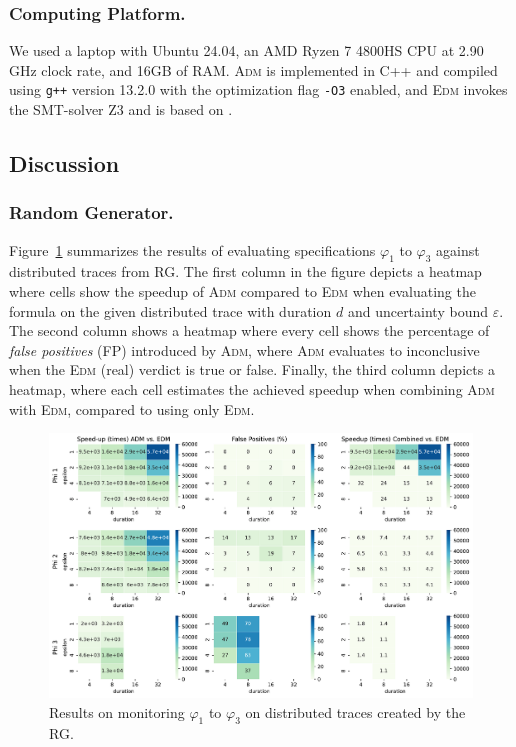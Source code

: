 \subsubsection{Computing Platform.}
We used a laptop with Ubuntu 24.04, an AMD Ryzen 7 4800HS CPU at 2.90 GHz clock rate, and 16GB of RAM.
\textsc{Adm} is implemented in C++ and compiled using \texttt{g++} version 13.2.0 with the optimization flag \texttt{-O3} enabled, and \textsc{Edm} invokes the SMT-solver Z3 \cite{MouraB08} and is based on \cite{MomtazAB23}.

\subsection{Discussion}

\subsubsection{Random Generator.}

Figure~\ref{fig:rgresults} summarizes the results of evaluating specifications $\varphi_1$ to $\varphi_3$ against distributed traces from RG. The first column in the figure depicts a heatmap where cells show the speedup of \textsc{Adm} compared to \textsc{Edm} when evaluating the formula on the given distributed trace with duration $d$ and uncertainty bound $\varepsilon$. The second column shows a heatmap where every cell shows the percentage of \emph{false positives} (FP) introduced by \textsc{Adm}, where \textsc{Adm} evaluates to inconclusive when the \textsc{Edm} (real) verdict is true or false. Finally, the third column depicts a heatmap, where each cell estimates the achieved speedup when combining \textsc{Adm} with \textsc{Edm}, compared to using only \textsc{Edm}.

\begin{figure}[t]
	\begin{center}
	\includegraphics[width=\linewidth]{speedup}
\caption{Results on monitoring $\varphi_{1}$ to $\varphi_{3}$ on distributed traces created by the RG.}
\label{fig:rgresults}
\end{center}
\end{figure}

